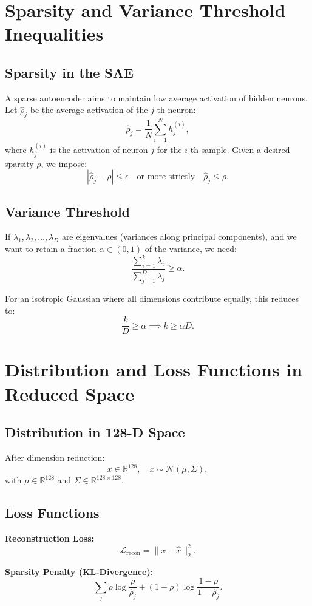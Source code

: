 \documentclass[11pt,a4paper]{article}
\begin{document}
\section{Sparsity and Variance Threshold Inequalities}

\subsection{Sparsity in the SAE}
A sparse autoencoder aims to maintain low average activation of hidden neurons. Let $\hat{\rho}_j$ be the average activation of the $j$-th neuron:
\[
\hat{\rho}_j = \frac{1}{N}\sum_{i=1}^N h_j^{(i)},
\]
where $h_j^{(i)}$ is the activation of neuron $j$ for the $i$-th sample. Given a desired sparsity $\rho$, we impose:
\[
|\hat{\rho}_j - \rho| \leq \epsilon \quad \text{or more strictly} \quad \hat{\rho}_j \leq \rho.
\]

\subsection{Variance Threshold}
If $\lambda_1, \lambda_2, \dots, \lambda_D$ are eigenvalues (variances along principal components), and we want to retain a fraction $\alpha \in (0,1)$ of the variance, we need:
\[
\frac{\sum_{i=1}^{k}\lambda_i}{\sum_{j=1}^{D}\lambda_j} \geq \alpha.
\]

For an isotropic Gaussian where all dimensions contribute equally, this reduces to:
\[
\frac{k}{D} \geq \alpha \implies k \geq \alpha D.
\]

\section{Distribution and Loss Functions in Reduced Space}

\subsection{Distribution in 128-D Space}
After dimension reduction:
\[
x \in \mathbb{R}^{128}, \quad x \sim \mathcal{N}(\mu, \Sigma),
\]
with $\mu \in \mathbb{R}^{128}$ and $\Sigma \in \mathbb{R}^{128 \times 128}$.

\subsection{Loss Functions}
\textbf{Reconstruction Loss:}
\[
\mathcal{L}_{\text{recon}} = \| x - \hat{x} \|_2^2.
\]

\textbf{Sparsity Penalty (KL-Divergence):}
\[
\sum_{j} \rho \log \frac{\rho}{\hat{\rho}_j} + (1-\rho) \log \frac{1-\rho}{1-\hat{\rho}_j}.
\]
\end{document}

